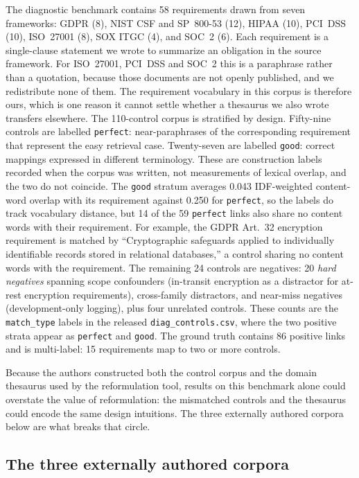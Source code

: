 \documentclass[a4paper,fleqn]{cas-sc}
\begin{document}
The diagnostic benchmark contains 58 requirements drawn from seven frameworks: GDPR (8), NIST CSF and SP~800-53 (12), HIPAA (10), PCI~DSS (10), ISO~27001 (8), SOX ITGC (4), and SOC~2 (6).
Each requirement is a single-clause statement we wrote to summarize an obligation in the source framework.
For ISO~27001, PCI~DSS and SOC~2 this is a paraphrase rather than a quotation, because those documents are not openly published, and we redistribute none of them.
The requirement vocabulary in this corpus is therefore ours, which is one reason it cannot settle whether a thesaurus we also wrote transfers elsewhere.
The 110-control corpus is stratified by design.
Fifty-nine controls are labelled \texttt{perfect}: near-paraphrases of the corresponding requirement that represent the easy retrieval case.
Twenty-seven are labelled \texttt{good}: correct mappings expressed in different terminology.
These are construction labels recorded when the corpus was written, not measurements of lexical overlap, and the two do not coincide.
The \texttt{good} stratum averages 0.043 IDF-weighted content-word overlap with its requirement against 0.250 for \texttt{perfect}, so the labels do track vocabulary distance, but 14 of the 59 \texttt{perfect} links also share no content words with their requirement.
For example, the GDPR Art.~32 encryption requirement is matched by ``Cryptographic safeguards applied to individually identifiable records stored in relational databases,'' a control sharing no content words with the requirement.
The remaining 24 controls are negatives: 20 \emph{hard negatives} spanning scope confounders (in-transit encryption as a distractor for at-rest encryption requirements), cross-family distractors, and near-miss negatives (development-only logging), plus four unrelated controls.
These counts are the \texttt{match\_type} labels in the released \texttt{diag\_controls.csv}, where the two positive strata appear as \texttt{perfect} and \texttt{good}.
The ground truth contains 86 positive links and is multi-label: 15 requirements map to two or more controls.

Because the authors constructed both the control corpus and the domain thesaurus used by the reformulation tool, results on this benchmark alone could overstate the value of reformulation: the mismatched controls and the thesaurus could encode the same design intuitions.
The three externally authored corpora below are what breaks that circle.

\subsection{The three externally authored corpora}
\label{sec:dataset-real}
\end{document}

